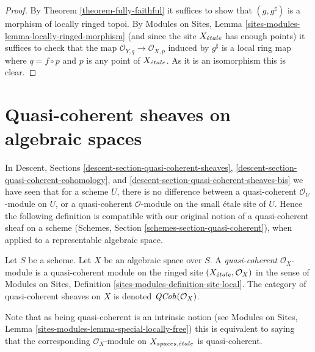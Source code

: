\begin{proof}
By
Theorem \ref{theorem-fully-faithful}
it suffices to show that $(g, g^\sharp)$ is a morphism of
locally ringed topoi. By
Modules on Sites, Lemma \ref{sites-modules-lemma-locally-ringed-morphism}
(and since the site $X_{\acute{e}tale}$ has enough points)
it suffices to check that the map
$\mathcal{O}_{Y, q} \to \mathcal{O}_{X, p}$ induced by $g^\sharp$
is a local ring map where $q = f \circ p$ and $p$ is any point of
$X_{\acute{e}tale}$. As it is an isomorphism this is clear.
\end{proof}














\section{Quasi-coherent sheaves on algebraic spaces}
\label{section-quasi-coherent}

\noindent
In
Descent, Sections \ref{descent-section-quasi-coherent-sheaves},
\ref{descent-section-quasi-coherent-cohomology}, and
\ref{descent-section-quasi-coherent-sheaves-bis}
we have seen that for a scheme $U$, there is no difference between a
quasi-coherent $\mathcal{O}_U$-module on $U$, or a quasi-coherent
$\mathcal{O}$-module on the small \'etale site of $U$. Hence the following
definition is compatible with our original notion of a quasi-coherent sheaf
on a scheme
(Schemes, Section \ref{schemes-section-quasi-coherent}),
when applied to a representable algebraic space.

\begin{definition}
\label{definition-quasi-coherent}
Let $S$ be a scheme. Let $X$ be an algebraic space over $S$.
A {\it quasi-coherent} $\mathcal{O}_X$-module
is a quasi-coherent module on the ringed site
$(X_{\acute{e}tale}, \mathcal{O}_X)$ in the sense of
Modules on Sites,
Definition \ref{sites-modules-definition-site-local}.
The category of quasi-coherent sheaves on $X$ is denoted
$\mathit{QCoh}(\mathcal{O}_X)$.
\end{definition}

\noindent
Note that as being quasi-coherent is an intrinsic notion (see
Modules on Sites, Lemma \ref{sites-modules-lemma-special-locally-free})
this is equivalent to saying that the corresponding $\mathcal{O}_X$-module
on $X_{spaces, {\acute{e}tale}}$ is quasi-coherent.


